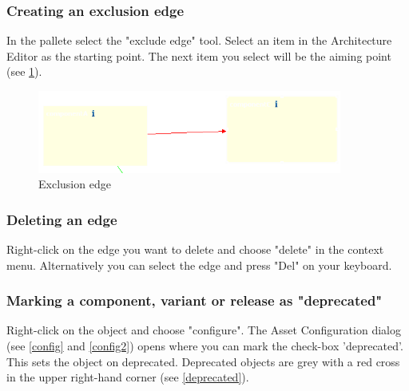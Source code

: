 \subsubsection{Creating an exclusion edge}

In the pallete select the "exclude edge" tool. Select an item in the Architecture Editor
as the starting point. The next item you select will be the aiming point (see \ref{exclude}).

\begin{figure}[h!]
\begin{center}
\includegraphics[width=10cm]{exclude.png}
   \caption{Exclusion edge}
\label{exclude}
\end{center}
\end{figure}\par

\subsubsection{Deleting an edge}

Right-click on the edge you want to delete and choose "delete" in the context menu.
Alternatively you can select the edge and press "Del" on your keyboard.


\subsubsection{Marking a component, variant or release as "deprecated"}
Right-click on the object and choose "configure". The Asset Configuration dialog (see \ref{config} and \ref{config2}) opens where you can
mark the check-box 'deprecated'. This sets the object on deprecated. Deprecated objects are grey with a 
red cross in the upper right-hand corner (see \ref{deprecated}).


